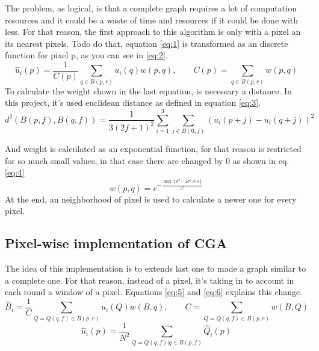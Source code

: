 \documentclass[a4paper,11pt,final]{article}
\begin{document}
The problem, as logical, is that a complete graph requires a lot of computation resources and it could be a waste of time and resources if it could be done with less. For that reason, the first approach to this algorithm is only with a pixel an its nearest pixels. Todo do that, equation \ref{eq:1} is transformed as an discrete function for pixel p, as you can see in \ref{eq:2}.  
\begin{equation}
\hat{u}_i(p)=\frac{1}{C(p)}\sum_{q\in B(p,r)} u_i(q)w(p,q), \qquad
C(p)=\sum_{q\in B(p,r)} w(p,q)
\label{eq:2}
\end{equation}
To calculate the weight shown in the last equation, is necessary a distance. In this project, it's used euclidean distance as defined in equation \ref{eq:3}.
\begin{equation}
d^2(B(p,f),B(q,f))=\frac{1}{3(2f+1)^2}\sum_{i=1}^3 \sum_{j\in B(0,f)} (u_i(p+j)-u_i(q+j))^2
\label{eq:3}
\end{equation}

And weight is calculated as an exponential function, for that reason is restricted for so much small values, in that case there are changed by 0 as shown in eq. \ref{eq:4}
\begin{equation}
w(p,q)=e^{-\frac{\max (d^2-2\sigma^2, 0.0)}{h^2}}
\label{eq:4}
\end{equation}
At the end, an neighborhood of pixel is used to calculate a newer one for every pixel.

\subsection{Pixel-wise implementation of CGA}
The idea of this implementation is to extends  last one to made a graph similar to a complete one. For that reason, instead of a pixel, it's taking in to account in each round a window of a pixel. Equations \ref {eq:5} and \ref{eq:6} explains this change.
\begin{equation}
\hat{B}_i = \frac{1}{C} \sum_{Q=Q(q,f)\in B(p,r)} u_i(Q)w(B,q), \qquad
C =  \sum_{Q=Q(q,f)\in B(p,r)} w(B,Q)
\label{eq:5}
\end{equation}
\begin{equation}
\hat{u}_i(p)=\frac{1}{N^2}\sum_{Q=Q(q,f)|q\in B(p,f)} \hat{Q}_i(p)
\label{eq:6}
\end{equation}
\end{document}
